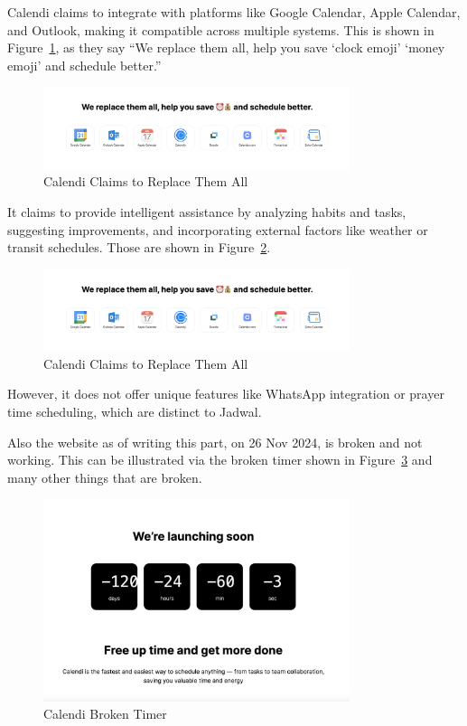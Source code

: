 \documentclass[12pt,a4paper]{report}
\begin{document}
Calendi claims to integrate with platforms like Google Calendar, Apple Calendar, and Outlook, making it compatible across multiple systems.
This is shown in Figure~\ref{fig:calendi-replace-em}, as they say ``We replace them all, help you save `clock emoji' `money emoji' and schedule better.''

\begin{figure}[!h]
    \centering
    \includegraphics[width=0.8\textwidth]{images/competitors/calendi-replace-em.png}
    \caption{Calendi Claims to Replace Them All}
    \label{fig:calendi-replace-em}
\end{figure}

It claims to provide intelligent assistance by analyzing habits and tasks, suggesting improvements, and incorporating external factors like weather or transit schedules. Those are shown in Figure~\ref{fig:calendi-features}.

\begin{figure}[!h]
    \centering
    \includegraphics[width=0.8\textwidth]{images/competitors/calendi-replace-em.png}
    \caption{Calendi Claims to Replace Them All}
    \label{fig:calendi-features}
\end{figure}

However, it does not offer unique features like WhatsApp integration or prayer time scheduling, which are distinct to Jadwal.

Also the website as of writing this part, on 26 Nov 2024, is broken and not working. This can be illustrated via the broken timer shown in Figure~\ref{fig:calendi-broken-timer} and many other things that are broken.

\begin{figure}[!h]
    \centering
    \includegraphics[width=0.8\textwidth]{images/competitors/calendi-broken-timer.png}
    \caption{Calendi Broken Timer}
    \label{fig:calendi-broken-timer}
\end{figure}
\end{document}
